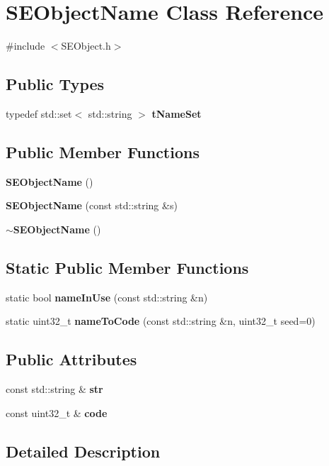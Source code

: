 \section{S\+E\+Object\+Name Class Reference}
\label{class_s_e_object_name}


{\ttfamily \#include $<$S\+E\+Object.\+h$>$}

\subsection*{Public Types}
\begin{DoxyCompactItemize}
\item 
typedef std\+::set$<$ std\+::string $>$ {\bf t\+Name\+Set}
\end{DoxyCompactItemize}
\subsection*{Public Member Functions}
\begin{DoxyCompactItemize}
\item 
{\bf S\+E\+Object\+Name} ()
\item 
{\bf S\+E\+Object\+Name} (const std\+::string \&s)
\item 
{\bf $\sim$\+S\+E\+Object\+Name} ()
\end{DoxyCompactItemize}
\subsection*{Static Public Member Functions}
\begin{DoxyCompactItemize}
\item 
static bool {\bf name\+In\+Use} (const std\+::string \&n)
\item 
static uint32\+\_\+t {\bf name\+To\+Code} (const std\+::string \&n, uint32\+\_\+t seed=0)
\end{DoxyCompactItemize}
\subsection*{Public Attributes}
\begin{DoxyCompactItemize}
\item 
const std\+::string \& {\bf str}
\item 
const uint32\+\_\+t \& {\bf code}
\end{DoxyCompactItemize}


\subsection{Detailed Description}


